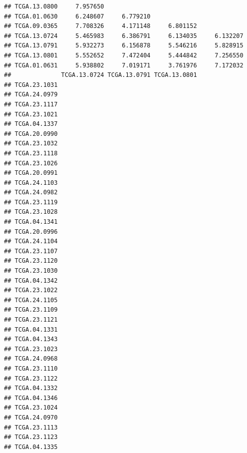 \documentclass[UTF8]{beamer}\usepackage[]{graphicx}\usepackage[]{color}
\makeatletter
\newenvironment{kframe}{%
 \def\at@end@of@kframe{}%
 \ifinner\ifhmode%
  \def\at@end@of@kframe{\end{minipage}}%
  \begin{minipage}{\columnwidth}%
 \fi\fi%
 \def\FrameCommand##1{\hskip\@totalleftmargin \hskip-\fboxsep
 \colorbox{shadecolor}{##1}\hskip-\fboxsep
     \hskip-\linewidth \hskip-\@totalleftmargin \hskip\columnwidth}%
 \MakeFramed {\advance\hsize-\width
   \@totalleftmargin\z@ \linewidth\hsize
   \@setminipage}}%
 {\par\unskip\endMakeFramed%
 \at@end@of@kframe}
\newenvironment{knitrout}{}{} %
\makeatother
\begin{document}
\begin{frame}[fragile]
\begin{knitrout}
\begin{kframe}
\begin{verbatim}
## TCGA.13.0800     7.957650                                       
## TCGA.01.0630     6.248607     6.779210                          
## TCGA.09.0365     7.708326     4.171148     6.801152             
## TCGA.13.0724     5.465983     6.386791     6.134035     6.132207
## TCGA.13.0791     5.932273     6.156878     5.546216     5.828915
## TCGA.13.0801     5.552652     7.472404     5.444842     7.256550
## TCGA.01.0631     5.938802     7.019171     3.761976     7.172032
##              TCGA.13.0724 TCGA.13.0791 TCGA.13.0801
## TCGA.23.1031                                       
## TCGA.24.0979                                       
## TCGA.23.1117                                       
## TCGA.23.1021                                       
## TCGA.04.1337                                       
## TCGA.20.0990                                       
## TCGA.23.1032                                       
## TCGA.23.1118                                       
## TCGA.23.1026                                       
## TCGA.20.0991                                       
## TCGA.24.1103                                       
## TCGA.24.0982                                       
## TCGA.23.1119                                       
## TCGA.23.1028                                       
## TCGA.04.1341                                       
## TCGA.20.0996                                       
## TCGA.24.1104                                       
## TCGA.23.1107                                       
## TCGA.23.1120                                       
## TCGA.23.1030                                       
## TCGA.04.1342                                       
## TCGA.23.1022                                       
## TCGA.24.1105                                       
## TCGA.23.1109                                       
## TCGA.23.1121                                       
## TCGA.04.1331                                       
## TCGA.04.1343                                       
## TCGA.23.1023                                       
## TCGA.24.0968                                       
## TCGA.23.1110                                       
## TCGA.23.1122                                       
## TCGA.04.1332                                       
## TCGA.04.1346                                       
## TCGA.23.1024                                       
## TCGA.24.0970                                       
## TCGA.23.1113                                       
## TCGA.23.1123                                       
## TCGA.04.1335                                       

\end{verbatim}
\end{kframe}
\end{knitrout}
\end{frame}
\end{document}
